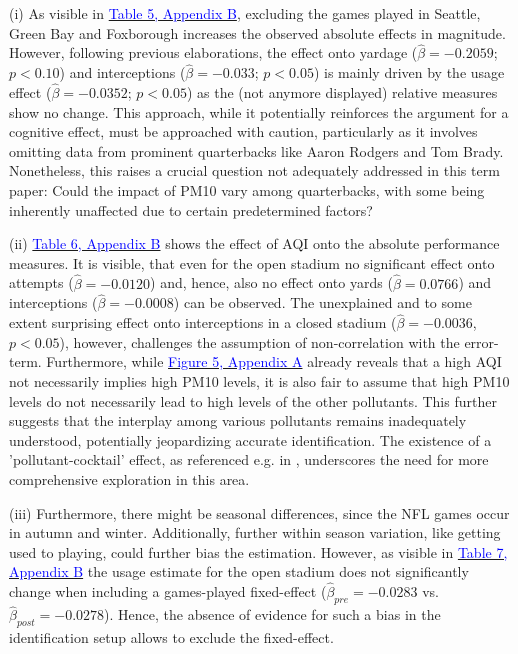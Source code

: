 \documentclass[12pt,a4paper]{article}
\newcommand{\mylink}[2]{\hyperref[#1]{\textcolor{blue}{#2}}}
\begin{document}
{(i) As visible in \mylink{A:T2}{Table 5, Appendix B}, excluding the games played in Seattle, Green Bay and Foxborough increases the observed absolute effects in magnitude. However, following previous elaborations, the effect onto yardage ($\hat{\beta} = -0.2059$; $p < 0.10$) and interceptions ($\hat{\beta} = -0.033$; $p < 0.05$) is mainly driven by the usage effect ($\hat{\beta} = -0.0352$; $p < 0.05$) as the (not anymore displayed) relative measures show no change. This approach, while it potentially reinforces the argument for a cognitive effect, must be approached with caution, particularly as it involves omitting data from prominent quarterbacks like Aaron Rodgers and Tom Brady. Nonetheless, this raises a crucial question not adequately addressed in this term paper: Could the impact of PM10 vary among quarterbacks, with some being inherently unaffected due to certain predetermined factors?


(ii) \mylink{A:T2}{Table 6, Appendix B} shows the effect of AQI onto the absolute performance measures. It is visible, that even for the open stadium no significant effect onto attempts ($\hat{\beta} = -0.0120$) and, hence, also no effect onto yards ($\hat{\beta} = 0.0766$) and interceptions ($\hat{\beta} = -0.0008$) can be observed. The unexplained and to some extent surprising effect onto interceptions in a closed stadium ($\hat{\beta} = -0.0036$, $p < 0.05$), however, challenges the assumption of non-correlation with the error-term.
Furthermore, while \mylink{AppF:4}{Figure 5, Appendix A} already reveals that a high AQI not necessarily implies high PM10 levels, it is also fair to assume that high PM10 levels do not necessarily lead to high levels of the other pollutants. This further suggests that the interplay among various pollutants remains inadequately understood, potentially jeopardizing accurate identification. The existence of a 'pollutant-cocktail' effect, as referenced e.g. in \citet{schlenker2016}, underscores the need for more comprehensive exploration in this area.

(iii) Furthermore, there might be seasonal differences, since the NFL games occur in autumn and winter. Additionally, further within season variation, like getting used to playing, could further bias the estimation. However, as visible in \mylink{A:T3}{Table 7, Appendix B} the usage estimate for the open stadium does not significantly change when including a games-played fixed-effect ($\hat{\beta}_{pre} = -0.0283$ vs. $\hat{\beta}_{post} = -0.0278$). Hence, the absence of evidence for such a bias in the identification setup allows to exclude the fixed-effect. 

}
\end{document}
